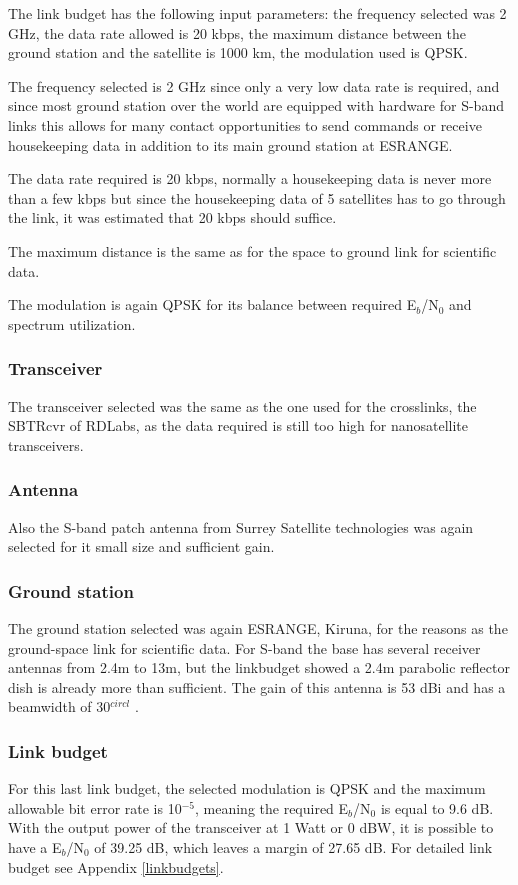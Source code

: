 The link budget has the following input parameters: the frequency selected was 2 GHz, the data rate allowed is 20 kbps, the maximum distance between the ground station and the satellite is 1000 km, the modulation used is QPSK.

The frequency selected is 2 GHz since only a very low data rate is required, and since most ground station over the world are equipped with hardware for S-band links this allows for many contact opportunities to send commands or receive housekeeping data in addition to its main ground station at ESRANGE.

The data rate required is 20 kbps, normally a housekeeping data is never more than a few kbps\cite{satcom} but since the housekeeping data of 5 satellites has to go through the link, it was estimated that 20 kbps should suffice.

The maximum distance is the same as for the space to ground link for scientific data.

The modulation is again QPSK for its balance between required E$_{b}$/N$_{0}$ and spectrum utilization.

\subsubsection{Transceiver}
The transceiver selected was the same as the one used for the crosslinks, the SBTRcvr of RDLabs, as the data required is still too high for nanosatellite transceivers.
\subsubsection{Antenna}
Also the S-band patch antenna from Surrey Satellite technologies was again selected for it small size and sufficient gain.
\subsubsection{Ground station}
The ground station selected was again ESRANGE, Kiruna, for the reasons as the ground-space link for scientific data. For S-band the base has several receiver antennas from 2.4m to 13m, but the linkbudget showed a 2.4m parabolic reflector dish is already more than sufficient. The gain of this antenna is 53 dBi and has a beamwidth of 30$^{circl}$ \cite{esrange}.

\subsubsection{Link budget}
For this last link budget, the selected modulation is QPSK and the maximum allowable bit error rate is 10$^{-5}$, meaning the required E$_{b}$/N$_{0}$ is equal to 9.6 dB. With the output power of the transceiver at 1 Watt or 0 dBW, it is possible to have a E$_{b}$/N$_{0}$ of 39.25 dB, which leaves a margin of 27.65 dB. For detailed link budget see Appendix \ref{linkbudgets}.

